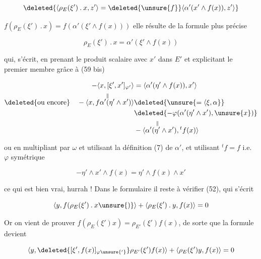 
\[
\deleted{\langle\rho_E(\xi')\mathbin{.}x,z'\rangle=\deleted{\unsure{f}}\langle\alpha'(x'\wedge f(x)),z'\rangle}
\]

 $f(\rho_E(\xi')\mathbin{.}x)=f(\alpha'(\xi'\wedge f(x)))$ elle résulte  de la formule plus précise

\[
\rho_E(\xi')\mathbin{.}x=\alpha'(\xi'\wedge f(x)) \tag*{(56 bis)}
\]

qui, s'écrit, en prenant le produit scalaire avec $x'$ dans $E'$ et explicitant le premier membre grâce à (59 bis)

\[
\begin{aligned}
-\langle x,[\xi',x']_{\varphi'}\rangle&=\langle\alpha'(\eta'\wedge f(x)),x'\rangle\\
\text{\deleted{ou encore}}\quad -\langle x,f\alpha'\overset{\Vert}{(}\eta'\wedge x')\rangle &\deleted{\unsure{=\langle\xi,\alpha}}\\
&\deleted{-\varphi(\alpha'(\eta'\wedge x'),\unsure{x})}\\
&-\langle\alpha'(\overset{\Vert}{\eta'}\wedge x'),{}^tf(x)\rangle
\end{aligned}
\]

ou en multipliant par $\omega$ et utilisant la définition (7) de $\alpha'$, et utilisant $ {}^tf=f$ i.e.  $\varphi$ symétrique

\[
-\eta'\wedge x'\wedge f(x)=\eta'\wedge f(x)\wedge x'
\]

ce qui est bien vrai, hurrah ! Dans le formulaire  il reste à vérifier (52), qui s'écrit

\[
\langle y,f(\rho_E(\xi')\mathbin{.}x\unsure{)}\rangle+\langle\rho_E(\xi')\mathbin{.}y,f(x)\rangle=0
\]

Or on vient de prouver $f(\rho_E(\xi')x)=\rho_{E'}(\xi')f(x)$,  de sorte que la formule devient

\[
\langle y,\deleted{[\xi',f(x)]_{\varphi\unsure{'}}}\rho_{E'}(\xi')f(x)\rangle+\langle\rho_E(\xi')y,f(x)\rangle=0
\]

